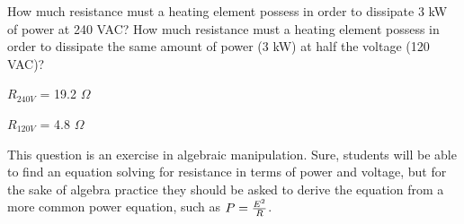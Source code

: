 

How much resistance must a heating element possess in order to dissipate 3 kW of power at 240 VAC?  How much resistance must a heating element possess in order to dissipate the same amount of power (3 kW) at half the voltage (120 VAC)?







$R_{240V}$ = 19.2 $\Omega$

\vskip 10pt

$R_{120V}$ = 4.8 $\Omega$







This question is an exercise in algebraic manipulation.  Sure, students will be able to find an equation solving for resistance in terms of power and voltage, but for the sake of algebra practice they should be asked to derive the equation from a more common power equation, such as $P = {E^2 \over R}$.




